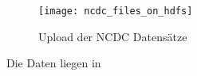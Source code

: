 \begin{figure}[ht]
    \centering
    \texttt{[image: ncdc\_files\_on\_hdfs]}
    \caption[Upload der NCDC Datensätze]{Upload der NCDC Datensätze}
    \label{fig:ncdc files hdfs}
\end{figure}

Die Daten liegen in 

\begin{comment}
    
Daher wird in diesem Beispiel stattdessen das \textbf{WebHDFS}\footnote{https://hadoop.apache.org/docs/r2.7.2/hadoop-project-dist/hadoop-hdfs/WebHDFS.html} benutzt.
\par
Das WebHDFS ist in der Sandbox bereits vollständig eingerichtet. Mit dessen Hilfe kann man ohne lokale Hadoop Installation per REST API mit dem HDFS interagieren. Man kann zum Beispiel auf seiner lokalen Maschine den Befehl zum Auflisten aller Dateien im \verb|/tmp/| Verzeichnis des HDFS mittels \verb|curl| absetzen. Dieser lautet 
\begin{lstlisting}[breaklines]
    curl -i "http://<hostname>:<port>/webhdfs/v1/tmp/?op=LISTSTATUS"
\end{lstlisting}
\begin{itemize}
    \item Mit der Option \verb|-i| werden die Response Header angezeigt.
    \item \verb|hostname| kann \verb|localhost| oder ein in der \verb|/etc/hosts| festgelegter Hostname für die Sandbox sein.
    \item Der Port ist standardmäßig \verb|50070|.
    \item Alles zwischen \verb|/v1| und \verb|?op| ist der Dateipfad.
    \item Der Parameter \verb|LISTSTATUS| ist der auszuführende HDFS Befehl.    
\end{itemize}

    

Abbildung \ref{fig:tmp list} zeigt die Ausgabe. Die Antwort ist ähnlich der eines typischen \verb|ls -l| Befehls: Zu sehen sind Dateien, deren Typ (hier vier mal 'DIRECTORY'), Zugriffsrechte, etc. 

\begin{figure}[ht]
    \centering
    \texttt{[image: webhdfs\_list\_tmp]}
    \caption[Dateiauflistung per WebHDFS]{Dateiauflistung per WebHDFS}
    \label{fig:tmp list}
\end{figure}
\end{comment}


